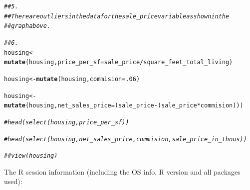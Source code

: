 \documentclass{article}\usepackage[]{graphicx}\usepackage[]{xcolor}
\makeatletter
\newcommand{\hlnum}[1]{\textcolor[rgb]{0.686,0.059,0.569}{#1}}%
\newcommand{\hlcom}[1]{\textcolor[rgb]{0.678,0.584,0.686}{\textit{#1}}}%
\newcommand{\hlopt}[1]{\textcolor[rgb]{0,0,0}{#1}}%
\newcommand{\hlstd}[1]{\textcolor[rgb]{0.345,0.345,0.345}{#1}}%
\newcommand{\hlkwb}[1]{\textcolor[rgb]{0.69,0.353,0.396}{#1}}%
\newcommand{\hlkwc}[1]{\textcolor[rgb]{0.333,0.667,0.333}{#1}}%
\newcommand{\hlkwd}[1]{\textcolor[rgb]{0.737,0.353,0.396}{\textbf{#1}}}%
\newenvironment{kframe}{%
 \def\at@end@of@kframe{}%
 \ifinner\ifhmode%
  \def\at@end@of@kframe{\end{minipage}}%
  \begin{minipage}{\columnwidth}%
 \fi\fi%
 \def\FrameCommand##1{\hskip\@totalleftmargin \hskip-\fboxsep
 \colorbox{shadecolor}{##1}\hskip-\fboxsep
     \hskip-\linewidth \hskip-\@totalleftmargin \hskip\columnwidth}%
 \MakeFramed {\advance\hsize-\width
   \@totalleftmargin\z@ \linewidth\hsize
   \@setminipage}}%
 {\par\unskip\endMakeFramed%
 \at@end@of@kframe}
\newenvironment{knitrout}{}{} %
\makeatother
\begin{document}
\begin{knitrout}
\begin{kframe}\begin{alltt}
\hlcom{## 5.}
\hlcom{## There are outliers in the data for the sale_price variable as shown in the}
\hlcom{## graph above.}

\hlcom{## 6.}
\hlstd{housing} \hlkwb{<-} \hlkwd{mutate}\hlstd{(housing,} \hlkwc{price_per_sf} \hlstd{=  sale_price}\hlopt{/}\hlstd{square_feet_total_living)}

\hlstd{housing} \hlkwb{<-} \hlkwd{mutate}\hlstd{(housing,} \hlkwc{commision} \hlstd{=} \hlnum{.06}\hlstd{)}

\hlstd{housing} \hlkwb{<-}
  \hlkwd{mutate}\hlstd{(housing,} \hlkwc{net_sales_price} \hlstd{= (sale_price} \hlopt{-} \hlstd{(sale_price} \hlopt{*} \hlstd{commision)))}

\hlcom{#head(select(housing,price_per_sf))                  }

\hlcom{#head(select(housing, net_sales_price, commision, sale_price_in_thous))}

\hlcom{##view(housing)}
\end{alltt}
\end{kframe}
\end{knitrout}

The R session information (including the OS info, R version and all
packages used):
\end{document}

